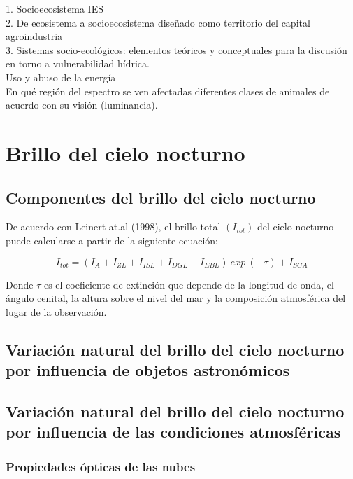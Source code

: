 1. Socioecosistema IES\\

2. De ecosistema a socioecosistema diseñado
como territorio del capital agroindustria\\

3. Sistemas socio-ecológicos: elementos teóricos y conceptuales para la discusión en torno a vulnerabilidad hídrica.\\

Uso y abuso de la energía\\

En qué región del espectro se ven afectadas diferentes clases de animales de acuerdo con su visión (luminancia).\\

\section{Brillo del cielo nocturno}

\subsection{Componentes del brillo del cielo nocturno}


De acuerdo con Leinert at.al (1998), el brillo total $(I_{tot})$ del cielo nocturno puede calcularse a partir de la siguiente ecuación:

\begin{equation}\label{eq:ej}
I_{tot}=(I_A + I_{ZL} + I_{ISL} + I_{DGL} + I_{EBL})\ exp \ (-\tau) + I_{SCA}
\end{equation}

Donde $\tau$ es el coeficiente de extinción que depende de la longitud de onda, el ángulo cenital, la altura sobre el nivel del mar y la composición atmosférica del lugar de la observación.


\subsection{Variación natural del brillo del cielo nocturno por influencia de objetos astronómicos}

\subsection{Variación natural del brillo del cielo nocturno por influencia de las condiciones atmosféricas}

\subsubsection{Propiedades ópticas de las nubes}

